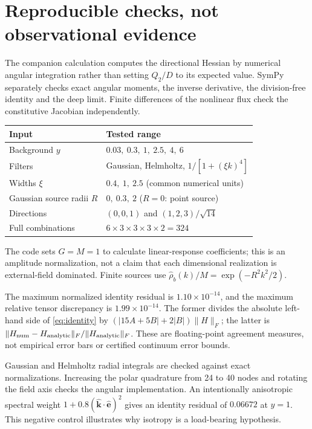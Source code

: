 \documentclass[11pt,letterpaper]{article}
\newcommand{\ee}{\hat{\boldsymbol e}}\newcommand{\kk}{\hat{\boldsymbol k}}
\begin{document}
\section{Reproducible checks, not observational evidence}
The companion calculation computes the directional Hessian by numerical
angular integration rather than setting $Q_2/D$ to its expected value.
SymPy separately checks exact angular moments, the inverse derivative,
the division-free identity and the deep limit. Finite differences of the
nonlinear flux check the constitutive Jacobian independently.
\begin{center}
\begin{tabular}{ll}
\toprule
Input & Tested range\\
\midrule
Background $y$ & $0.03,\ 0.3,\ 1,\ 2.5,\ 4,\ 6$\\
Filters & Gaussian, Helmholtz, $1/[1+(\xi k)^4]$\\
Widths $\xi$ & $0.4,\ 1,\ 2.5$ (common numerical units)\\
Gaussian source radii $R$ & $0,\ 0.3,\ 2$ ($R=0$: point source)\\
Directions & $(0,0,1)$ and $(1,2,3)/\sqrt{14}$\\
Full combinations & $6\times3\times3\times3\times2=324$\\
\bottomrule
\end{tabular}
\end{center}
The code sets $G=M=1$ to calculate linear-response coefficients; this is an
amplitude normalization, not a claim that each dimensional realization is
external-field dominated. Finite sources use
$\widehat\rho_b(k)/M=\exp(-R^2k^2/2)$.

The maximum normalized identity residual is $1.10\times10^{-14}$, and the
maximum relative tensor discrepancy is $1.99\times10^{-14}$. The former
divides the absolute left-hand side of \eqref{eq:identity} by
$(|15A+5B|+2|B|)\|H\|_F$; the latter is
$\|H_{\rm num}-H_{\rm analytic}\|_F/\|H_{\rm analytic}\|_F$.
These are floating-point agreement measures, not empirical error bars or
certified continuum error bounds.

Gaussian and Helmholtz radial integrals are checked against exact
normalizations. Increasing the polar quadrature from 24 to 40 nodes and
rotating the field axis checks the angular implementation. An intentionally
anisotropic spectral weight $1+0.8(\kk\cdot\ee)^2$ gives an identity residual
of $0.06672$ at $y=1$. This negative control illustrates why isotropy is a
load-bearing hypothesis.
\end{document}
